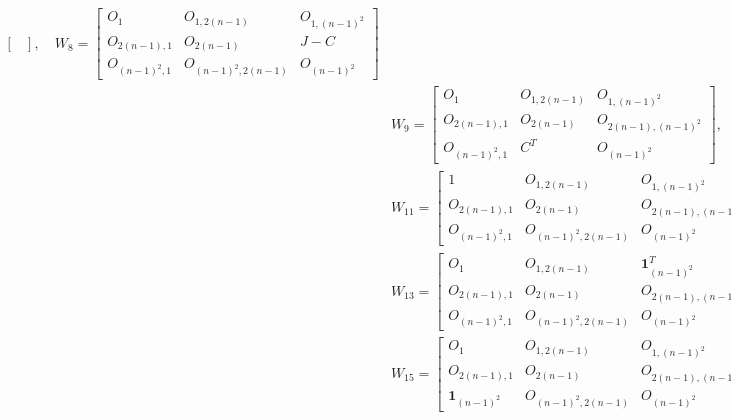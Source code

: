 \begin{align*}
\begin{bmatrix}
    \end{bmatrix}, \quad
    W_8 = \begin{bmatrix}
    O_1 & O_{1,2(n-1)} & O_{1,(n-1)^2}\\
    O_{2(n-1),1} &    O_{2(n-1)} & J-C \\
    O_{(n-1)^2,1} &    O_{(n-1)^2, 2(n-1)} & O_{(n-1)^2}
    \end{bmatrix}\\
    &W_9 = \begin{bmatrix}
    O_1 & O_{1,2(n-1)} & O_{1,(n-1)^2}\\
    O_{2(n-1),1} &    O_{2(n-1)} & O_{2(n-1), (n-1)^2} \\
    O_{(n-1)^2,1} &    C^T & O_{(n-1)^2}
    \end{bmatrix}, \quad
    W_{10} = \begin{bmatrix}
    O_1 & O_{1,2(n-1)} & O_{1,(n-1)^2}\\
    O_{2(n-1),1} &    O_{2(n-1)} & O_{2(n-1), (n-1)^2} \\
    O_{(n-1)^2,1} &    J-C^T & O_{(n-1)^2}
    \end{bmatrix}\\
    &W_{11} =\begin{bmatrix}
        1& O_{1,2(n-1)} & O_{1,(n-1)^2}\\
    O_{2(n-1),1} &    O_{2(n-1)} & O_{2(n-1), (n-1)^2} \\
    O_{(n-1)^2,1} &    O_{(n-1)^2, 2(n-1)} & O_{(n-1)^2}
    \end{bmatrix},\quad
    W_{12} = \begin{bmatrix}
    O_1 & \mathbf{1}_{2(n-1)}^T & O_{1,(n-1)^2}\\
    O_{2(n-1),1} &    O_{2(n-1)} & O_{2(n-1), (n-1)^2} \\
    O_{(n-1)^2,1} &    O_{(n-1)^2, 2(n-1)} & O_{(n-1)^2}
    \end{bmatrix} \\
    &W_{13} =\begin{bmatrix}
    O_1& O_{1,2(n-1)} & \mathbf{1}_{(n-1)^2}^T\\
    O_{2(n-1),1} &    O_{2(n-1)} & O_{2(n-1), (n-1)^2} \\
    O_{(n-1)^2,1} &    O_{(n-1)^2, 2(n-1)} & O_{(n-1)^2}
    \end{bmatrix},\quad
    W_{14} = \begin{bmatrix}
    O_1 & O_{1,2(n-1)} & O_{1,(n-1)^2}\\
    \mathbf{1}_{2(n-1)} &    O_{2(n-1)} & O_{2(n-1), (n-1)^2} \\
    O_{(n-1)^2,1} &    O_{(n-1)^2, 2(n-1)} & O_{(n-1)^2}
    \end{bmatrix} \\
    &W_{15} =\begin{bmatrix}
    O_1& O_{1,2(n-1)} & O_{1,(n-1)^2}\\
    O_{2(n-1),1} &    O_{2(n-1)} & O_{2(n-1), (n-1)^2} \\
    \mathbf{1}_{(n-1)^2} &    O_{(n-1)^2, 2(n-1)} & O_{(n-1)^2}
    \end{bmatrix}
\end{align*}

